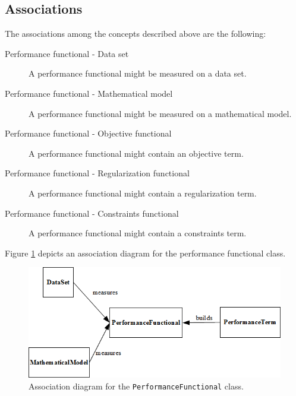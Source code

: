 \subsection*{Associations}

The associations among the concepts described above are the following:

\begin{description}
\item[Performance functional - Data set] A performance functional might be measured on a data set.  

\item[Performance functional - Mathematical model] A performance functional might be measured on a mathematical model. 

\item[Performance functional - Objective functional] A performance functional might contain an objective term. 

\item[Performance functional - Regularization functional] A performance functional might contain a regularization term.

\item[Performance functional - Constraints functional] A performance functional might contain a constraints term.
\end{description}

Figure \ref{PerformanceFunctionalAssociationDiagram} depicts an association diagram for the performance functional class. 

\begin{figure}[h!]
\begin{center}
\includegraphics[width=1.0\textwidth]{performance_functional/performance_functional_association_diagram}
\caption{Association diagram for the \lstinline'PerformanceFunctional' class.}\label{PerformanceFunctionalAssociationDiagram}
\end{center}
\end{figure}

